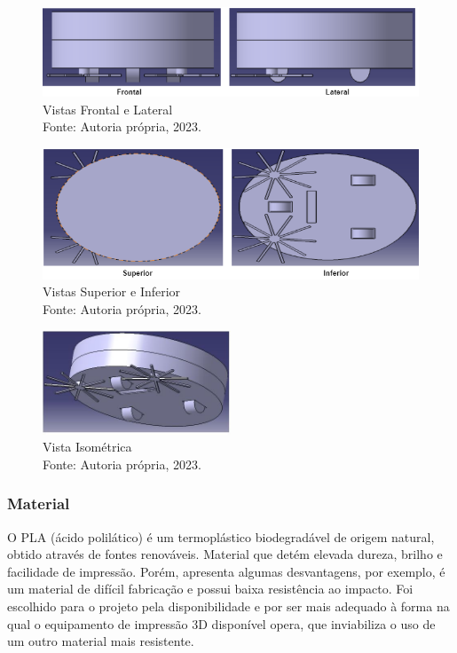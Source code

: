 \begin{figure}[h]
\includegraphics[width=\textwidth]{figuras/fig2.PNG}
\caption{Vistas Frontal e Lateral \\ Fonte: Autoria própria, 2023.}
\label{fig2}
\end{figure}

\begin{figure}[h]
\includegraphics[width=\textwidth]{figuras/fig3.PNG}
\caption{Vistas Superior e Inferior \\ Fonte: Autoria própria, 2023.}
\label{fig3}
\end{figure}

\begin{figure}[h]
\includegraphics[width=0.5\textwidth]{figuras/fig4.jpg}
\caption{Vista Isométrica \\ Fonte: Autoria própria, 2023.}
\label{fig4}
\end{figure}


\subsubsection{Material}
O PLA (ácido polilático) é um termoplástico biodegradável de origem natural, obtido através de fontes renováveis. Material que detém elevada dureza, brilho e facilidade de impressão. Porém, apresenta algumas desvantagens, por exemplo, é um material de difícil fabricação e possui baixa resistência ao impacto. Foi escolhido para o projeto pela disponibilidade e por ser mais adequado à forma na qual o equipamento de impressão 3D disponível opera, que inviabiliza o uso de um outro material mais resistente.



